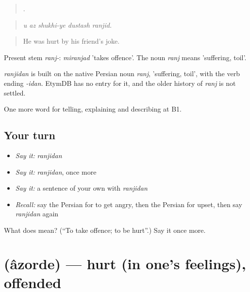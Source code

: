 \begin{quote}
    .
\end{quote}

\begin{quote}
\emph{u az shukhi-ye dustash ranjid.}
\end{quote}

\begin{quote}
He was hurt by his friend's joke.
\end{quote}

Present stem \emph{ranj-}: \emph{miranjad} 'takes offence'. The noun \emph{ranj} means 'suffering, toil'.

\begin{cousinweb}
\emph{ranjidan} is built on the native Persian noun \emph{ranj}, 'suffering, toil', with the verb ending \emph{-idan}. EtymDB has no entry for it, and the older history of \emph{ranj} is not settled.
\end{cousinweb}

\begin{grammarlens}[title={What you've built}]
One more word for telling, explaining and describing at B1.
\end{grammarlens}

\subsection*{Your turn}
\begin{itemize}
\raggedright
  \item \emph{Say it:} \emph{ranjidan}
  \item \emph{Say it:} \emph{ranjidan}, once more
  \item \emph{Say it:} a sentence of your own with \emph{ranjidan}
  \item \emph{Recall:} say the Persian for to get angry, then the Persian for upset, then say \emph{ranjidan} again
\end{itemize}

\begin{tcolorbox}[breakable,colback=teal!4,colframe=teal!35!black,title={Before you move on}]
What does  mean? (\textquotedblleft{}To take offence; to be hurt\textquotedblright{}.) Say it once more.
\end{tcolorbox}
\section[\texorpdfstring{\fa{آزرده} (âzorde)}{آزرده (âzorde)}]{ (âzorde) — hurt (in one's feelings), offended}

